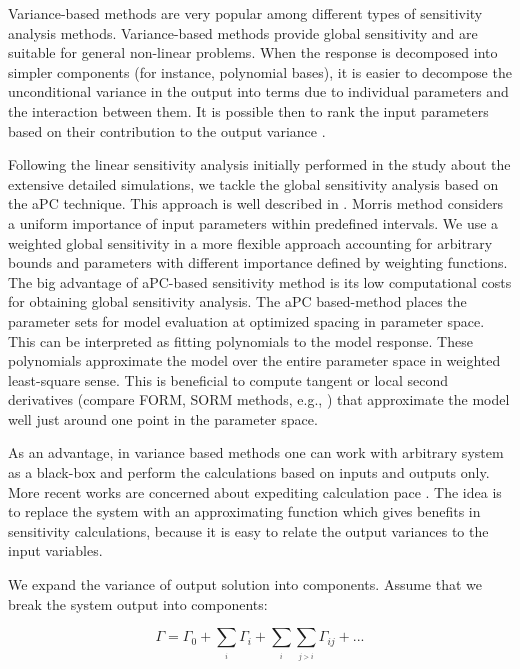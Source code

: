 Variance-based methods are very popular among different types of sensitivity
analysis methods. Variance-based methods provide global sensitivity and are suitable for general non-linear problems. When the response is decomposed into simpler
components (for instance, polynomial bases), it is easier to decompose the
unconditional variance in the output into terms due to individual parameters
and the interaction between them. It is possible then to rank the input
parameters based on their contribution to the output variance
\cite{saltelli2007global,reuter2008global}.

Following the linear sensitivity analysis initially performed in the study about
the extensive detailed simulations, we tackle the global sensitivity analysis
based on the aPC technique. This approach is well described in
\cite{oladyshkin2011concept,
OladNowakBarros_AWR2011}. Morris method \cite{Morris1991} considers a uniform
importance of input parameters within predefined intervals. We use a weighted
global sensitivity in a more flexible approach accounting for arbitrary bounds
and parameters with different importance defined by weighting functions. The
big advantage of aPC-based sensitivity method is its low computational costs
for obtaining global sensitivity analysis. The aPC based-method
places the parameter sets for model evaluation at optimized spacing in
parameter space. This can be interpreted as fitting polynomials to the model
response. These polynomials approximate the model over the entire parameter
space in weighted least-square sense. This is beneficial to compute 
tangent or local second derivatives (compare FORM, SORM methods, e.g.,
\cite{Jang1994}) that approximate the model well just around one point in the
parameter space.
 
As an advantage, in variance based methods one can work with arbitrary system as
a black-box and perform the calculations based on inputs and outputs only. More
recent works are concerned about expediting calculation pace
\cite{crestaux2009polynomial,oladyshkin2011concept, OladNowakBarros_AWR2011}.
The idea is to replace the system with an approximating function which gives
benefits in sensitivity calculations, because it is easy to relate the output
variances to
the input variables. 

We expand the variance of output solution into
components. Assume that we break the system output into components:

\begin{equation}
\Gamma=\Gamma_{0}+\underset{_{i}}{\sum}\Gamma_{i}+\underset{_{i}}{\sum}\underset
{_{j>i}}{\sum}\Gamma_{ij}+...\label{eq:comp}\end{equation}

